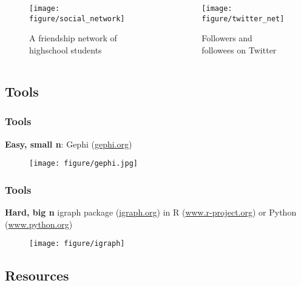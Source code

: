 \documentclass[serif, aspectratio=169]{beamer}
\begin{document}
\begin{frame}

\begin{columns}
\begin{column}{0.5\textwidth}
\begin{figure}
    \centering
    \texttt{[image: figure/social\_network]}
\caption{A friendship network of highschool students}
\end{figure}
\end{column}
\begin{column}{0.5\textwidth}
\begin{figure}
    \centering
    \texttt{[image: figure/twitter\_net]}
\caption{Followers and followees on Twitter}
\end{figure}
\end{column}
\end{columns}
 
\end{frame}



\subsection{Tools}

\begin{frame}
\frametitle{Tools}

\centering \textbf{Easy, small n}: Gephi (\url{gephi.org})

\begin{figure}
    \centering
    \texttt{[image: figure/gephi.jpg]}
\end{figure}

\end{frame}

\begin{frame}
\frametitle{Tools}

\centering \textbf{Hard, big n} igraph package (\url{igraph.org}) in R (\url{www.r-project.org}) or Python (\url{www.python.org})

\begin{figure}
    \centering
    \texttt{[image: figure/igraph]}
\end{figure}

\end{frame}

\subsection{Resources}
\end{document}
